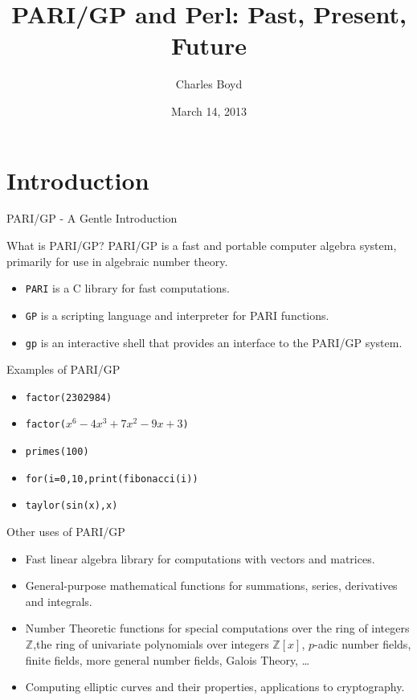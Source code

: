 \documentclass{beamer}
\title[PARI/GP and Perl]{PARI/GP and Perl: Past, Present, Future}
\author{Charles Boyd}
\institute{Houston Perl Mongers}
\date{March 14, 2013}
\begin{document}
\begin{frame}
  \titlepage
\end{frame}

\section{Introduction}

\begin{frame}{PARI/GP - A Gentle Introduction}

\begin{block}{What is PARI/GP?}
PARI/GP is a fast and portable computer algebra system, primarily for use in algebraic number theory. 
\end{block}

\begin{itemize}
	\item \texttt{PARI} is a C library for fast computations.
    \item \texttt{GP} is a scripting language and interpreter for PARI functions.
    \item \texttt{gp} is an interactive shell that provides an interface to the PARI/GP system.
\end{itemize}

\end{frame}

\begin{frame}{Examples of PARI/GP}

\begin{itemize}
	\item \texttt{factor(2302984)}
    \item \texttt{factor($x^6 - 4x^3 + 7x^2 - 9x + 3$)}
    \item \texttt{primes(100)}
    \item \texttt{for(i=0,10,print(fibonacci(i))}
    \item \texttt{taylor(sin(x),x)}
\end{itemize}

\end{frame}

\begin{frame}{Other uses of PARI/GP}

\begin{itemize}
	\item Fast linear algebra library for computations with vectors and matrices.
    \item General-purpose mathematical functions for summations, series, derivatives and integrals.
    \item Number Theoretic functions for special computations over the ring of integers $\mathbb{Z}$,the ring of univariate polynomials over integers $\mathbb{Z}[x]$, $p$-adic number fields, finite fields, more general number fields, Galois Theory, \dots
    \item Computing elliptic curves and their properties, applications to cryptography.
\end{itemize}

\end{frame}
\end{document}
